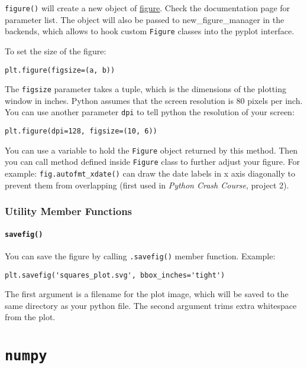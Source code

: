\documentclass[12pt]{book}
\begin{document}
\texttt{figure()} will create a new object of \href{https://matplotlib.org/3.1.0/api/\_as\_gen/matplotlib.figure.Figure.html\#matplotlib-figure-figure}{figure}. Check the documentation page for parameter list. The object will also be passed to new\_figure\_manager in the backends, which allows to hook custom \texttt{Figure} classes into the pyplot interface.

To set the size of the figure:
\begin{verbatim}
plt.figure(figsize=(a, b))
\end{verbatim}
The \texttt{figsize} parameter takes a tuple, which is the dimensions of the plotting window in inches. Python assumes that the screen resolution is 80 pixels per inch. You can use another parameter \texttt{dpi} to tell python the resolution of your screen:
\begin{verbatim}
plt.figure(dpi=128, figsize=(10, 6))
\end{verbatim}

You can use a variable to hold the \texttt{Figure} object returned by this method. Then you can call method defined inside \texttt{Figure} class to further adjust your figure. For example: \texttt{fig.autofmt\_xdate()} can draw the date labels in x axis diagonally to prevent them from overlapping (first used in \emph{Python Crash Course}, project 2).

\subsection{Utility Member Functions}
\label{sec:org4853202}
\subsubsection{\texttt{savefig()}}
\label{sec:org4a9fa2a}
You can save the figure by calling \texttt{.savefig()} member function. Example:
\begin{verbatim}
plt.savefig('squares_plot.svg', bbox_inches='tight')
\end{verbatim}
The first argument is a filename for the plot image, which will be saved to the same directory as your python file. The second argument trims extra whitespace from the plot.
\chapter{\texttt{numpy}}
\label{sec:org463ec7d}
\end{document}
